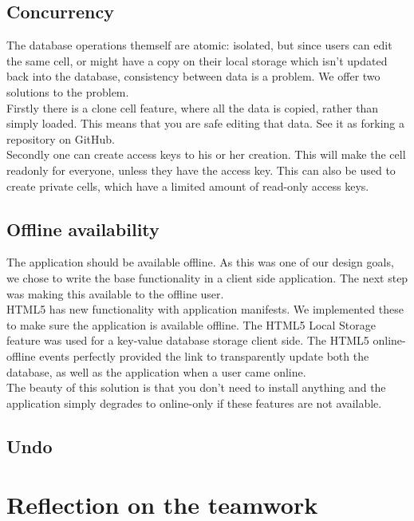 \documentclass[10pt,a4paper]{report}
\begin{document}
		\subsection{Concurrency}
			The database operations themself are atomic: isolated, but since users can edit the same cell, or might have a copy on their local storage which isn't updated back into the database, consistency between data is a problem. We offer two solutions to the problem.\\ 
			
			Firstly there is a clone cell feature, where all the data is copied, rather than simply loaded. This means that you are safe editing that data. See it as forking a repository on GitHub.\\
			
			Secondly one can create access keys to his or her creation. This will make the cell readonly for everyone, unless they have the access key. This can also be used to create private cells, which have a limited amount of read-only access keys.
		
		\subsection{Offline availability}
			The application should be available offline. As this was one of our design goals, we chose to write the base functionality in a client side application. The next step was making this available to the offline user.\\
			HTML5 has new functionality with application manifests. We implemented these to make sure the application is available offline. The HTML5 Local Storage feature was used for a key-value database storage client side. The HTML5 online-offline events perfectly provided the link to transparently update both the database, as well as the application when a user came online.\\
			The beauty of this solution is that you don't need to install anything and the application simply degrades to online-only if these features are not available.
		
		\subsection{Undo}
	
	\section{Reflection on the teamwork}
		
\end{document}
